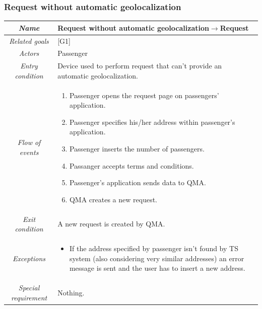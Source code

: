 \subsubsection{Request without automatic geolocalization}

\begin{flushleft}
\begin{tabular}{c|>{\centering}p{10cm}}
\hline 
\emph{Name} & \raggedright{}Request without automatic geolocalization$\rightarrow$Request\tabularnewline
\hline 
\emph{Related goals} & \raggedright{}{[}G1{]}\tabularnewline
\hline 
\emph{Actors} & \raggedright{}Passenger\tabularnewline
\hline 
\emph{Entry condition} & \raggedright{}Device used to perform request that can't provide an
automatic geolocalization.\tabularnewline
\hline 
\emph{Flow of events} & \begin{enumerate}
\item \begin{raggedright}
Passenger opens the request page on passengers' application.
\par\end{raggedright}
\item \begin{raggedright}
Passenger specifies his/her address within passenger's application.
\par\end{raggedright}
\item \begin{raggedright}
Passenger inserts the number of passengers.
\par\end{raggedright}
\item \begin{raggedright}
Passanger accepts terms and conditions.
\par\end{raggedright}
\item \begin{raggedright}
Passenger's application sends data to QMA.
\par\end{raggedright}
\item \raggedright{}QMA creates a new request.\end{enumerate}
\tabularnewline
\hline 
\emph{Exit condition} & \raggedright{}A new request is created by QMA.\tabularnewline
\hline 
\emph{Exceptions} & \begin{itemize}
\item \raggedright{}If the address specified by passenger isn't found by
TS system (also considering very similar addresses) an error message
is sent and the user has to insert a new address.\end{itemize}
\tabularnewline
\hline 
\emph{Special requirement} & \raggedright{}Nothing.\tabularnewline
\hline 
\end{tabular}
\par\end{flushleft}

